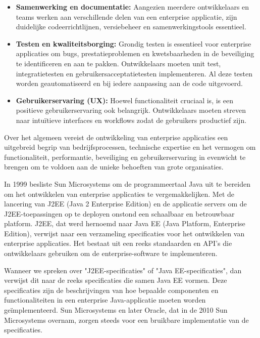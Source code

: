 \begin{itemize}
\item{\textbf{Samenwerking en documentatie:}} Aangezien meerdere ontwikkelaars en teams werken aan verschillende delen van een enterprise applicatie, zijn duidelijke codeerrichtlijnen,  versiebeheer en samenwerkingstools essentieel.

\item{\textbf{Testen en kwaliteitsborging:}} Grondig testen is essentieel voor enterprise applicaties om bugs, prestatieproblemen en kwetsbaarheden in de beveiliging te identificeren en aan te pakken. Ontwikkelaars moeten unit test,  integratietesten en gebruikersacceptatietesten implementeren. Al deze testen worden geautomatiseerd en bij iedere aanpassing aan de code uitgevoerd.

\item{\textbf{Gebruikerservaring (UX):}} Hoewel functionaliteit cruciaal is, is een positieve gebruikerservaring ook belangrijk. Ontwikkelaars moeten streven naar intuïtieve interfaces en workflows zodat de gebruikers productief zijn.
\end{itemize}

Over het algemeen vereist de ontwikkeling van enterprise applicaties een uitgebreid begrip van bedrijfsprocessen, technische expertise en het vermogen om functionaliteit, performantie, beveiliging en gebruikerservaring in evenwicht te brengen om te voldoen aan de unieke behoeften van grote organisaties.

In 1999 besliste Sun Microsystems om de programmeertaal Java uit te bereiden om het ontwikkelen van enterprise applicaties te vergemakkelijken.  Met de lancering van J2EE (Java 2 Enterprise Edition) en de applicatie servers om de J2EE-toepassingen op te deployen onstond een schaalbaar en betrouwbaar platform. 
J2EE,  dat werd hernoemd naar Java EE (Java Platform,  Enterprise Edition), verwijst naar een verzameling specificaties voor het ontwikkelen van enterprise applicaties.  Het bestaat uit een reeks standaarden en API's die ontwikkelaars gebruiken om de enterprise-software te implementeren. 

Wanneer we spreken over "J2EE-specificaties" of "Java EE-specificaties", dan verwijst dit naar de reeks specificaties die samen Java EE vormen.  Deze specificaties zijn de  beschrijvingen van hoe bepaalde componenten en functionaliteiten in een enterprise Java-applicatie moeten worden geïmplementeerd.  Sun Microsystems en later Oracle, dat in de 2010 Sun Microsystems overnam, zorgen steeds voor een bruikbare implementatie van de specificaties. 

